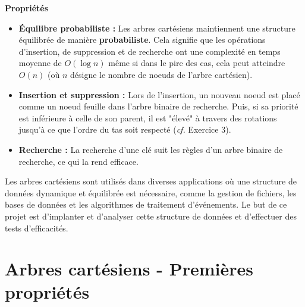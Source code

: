 \documentclass[a4paper,12pt]{report}
\begin{document}
\textbf{Propriétés}
\begin{itemize}

    \item \textbf{Équilibre probabiliste :} Les arbres cartésiens maintiennent une structure équilibrée de manière \textbf{probabiliste}. 
        Cela signifie que les opérations d'insertion, de suppression et de recherche ont une complexité en temps moyenne de \( O(\log n) \) même si 
        dans le pire des cas, cela peut atteindre \( O(n) \) (où \( n \) désigne le nombre de noeuds de l'arbre cartésien).

    \item \textbf{Insertion et suppression :} Lors de l'insertion, un nouveau noeud est placé comme un noeud feuille dans l'arbre binaire 
        de recherche. Puis, si sa priorité est inférieure à celle de son parent, il est "élevé" à travers des rotations jusqu'à ce que l'ordre du tas soit 
        respecté (\textit{cf.} Exercice 3).

    \item \textbf{Recherche :} La recherche d'une clé suit les règles d'un arbre binaire de recherche, ce qui la rend efficace.

\end{itemize}


\newpage

Les arbres cartésiens sont utilisés dans diverses applications où une structure de données dynamique et équilibrée est nécessaire, comme la gestion de 
    fichiers, les bases de données et les algorithmes de traitement d'événements. Le but de ce projet est d'implanter et d'analyser cette structure de 
    données et d'effectuer des tests d'efficacités.






\newpage

\renewcommand{\chaptername}{Exercice}
\chapter{Arbres cartésiens - Premières propriétés}



\end{document}
